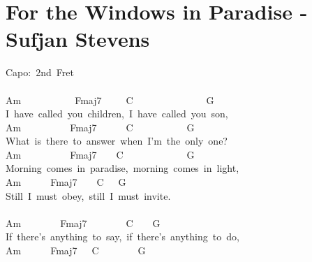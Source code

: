 \documentclass[]{book}
\let\stdsection\section
\renewcommand\section{\clearpage\stdsection}
\begin{document}
\hypertarget{for-the-windows-in-paradise---sufjan-stevens}{%
\section{For the Windows in Paradise - Sufjan Stevens}\label{for-the-windows-in-paradise---sufjan-stevens}}

Capo:~2nd~Fret\\
~\\
Am~~~~~~~~~~~Fmaj7~~~~~C~~~~~~~~~~~~~~~G\\
I~have~called~you~children,~I~have~called~you~son,\\
Am~~~~~~~~~~Fmaj7~~~~~~C~~~~~~~~~~~G\\
What~is~there~to~answer~when~I'm~the~only~one?\\
Am~~~~~~~~~~Fmaj7~~~~C~~~~~~~~~~~~~G\\
Morning~comes~in~paradise,~morning~comes~in~light,\\
Am~~~~~~Fmaj7~~~~C~~~G\\
Still~I~must~obey,~still~I~must~invite.\\
~\\
\hspace*{0.333em}\hspace*{0.333em}\hspace*{0.333em}\hspace*{0.333em}\hspace*{0.333em}\hspace*{0.333em}\hspace*{0.333em}\hspace*{0.333em}\hspace*{0.333em}\hspace*{0.333em}\hspace*{0.333em}Am~~~~~~~~Fmaj7~~~~~~~~C~~~~G\\
If~there's~anything~to~say,~if~there's~anything~to~do,\\
\hspace*{0.333em}\hspace*{0.333em}\hspace*{0.333em}\hspace*{0.333em}\hspace*{0.333em}\hspace*{0.333em}\hspace*{0.333em}\hspace*{0.333em}\hspace*{0.333em}\hspace*{0.333em}\hspace*{0.333em}Am~~~~~~Fmaj7~~~C~~~~~~~~G\\
\end{document}

